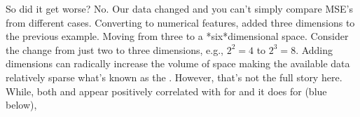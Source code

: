 \documentclass[letterpaper,10pt,english]{jupyterBook}
\begin{document}
\sphinxAtStartPar
So did it get worse? No. Our data changed and you can’t simply compare MSE’s from different cases. Converting  to numerical features, added three dimensions to the previous example. Moving from three to a *six\sphinxhyphen{}*dimensional space. Consider the change from just two to three dimensions, e.g., \(2^{2}=4\) to \(2^{3}=8\). Adding dimensions can radically increase the volume of space making the available data relatively sparse \sphinxhyphen{}what’s known as the . \sphinxhyphen{}However, that’s not the full story here. While, both  and  appear positively correlated with for  and  it does  for  (blue below),
\end{document}
